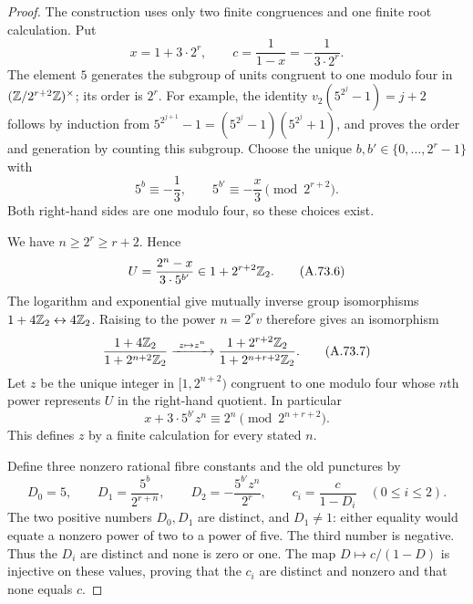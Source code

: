 \begin{proof}
The construction uses only two finite congruences and one finite
root calculation.  Put
\[
             x=1+3\cdot2^r,\qquad c=\frac1{1-x}=-\frac1{3\cdot2^r}.
       \tag{A.73.4}
\]
The element $5$ generates the subgroup of units congruent to one
modulo four in $(\mathbb Z/2^{r+2}\mathbb Z)^\times$; its order is $2^r$.
For example, the identity
$v_2(5^{2^j}-1)=j+2$ follows by induction from
$5^{2^{j+1}}-1=(5^{2^j}-1)(5^{2^j}+1)$, and proves the order
and generation by counting this subgroup.
Choose the unique $b,b'\in\{0,\ldots,2^r-1\}$ with
\[
           5^b\equiv-\frac13,
       \qquad 5^{b'}\equiv-\frac{x}{3}\pmod{2^{r+2}}.
       \tag{A.73.5}
\]
Both right-hand sides are one modulo four, so these choices exist.

We have $n\ge2^r\ge r+2$.  Hence
\[
             U=\frac{2^n-x}{3\cdot5^{b'}}
                           \in1+2^{r+2}\mathbb Z_2.
       \tag{A.73.6}
\]
The logarithm and exponential give mutually inverse group
isomorphisms $1+4\mathbb Z_2\leftrightarrow4\mathbb Z_2$.
Raising to the power $n=2^rv$ therefore gives an isomorphism
\[
 \frac{1+4\mathbb Z_2}{1+2^{n+2}\mathbb Z_2}
       \xrightarrow{\ z\mapsto z^n\ }
 \frac{1+2^{r+2}\mathbb Z_2}{1+2^{n+r+2}\mathbb Z_2}.
       \tag{A.73.7}
\]
Let $z$ be the unique integer in $[1,2^{n+2})$ congruent to one
modulo four whose $n$th power represents $U$ in the right-hand
quotient.  In particular
\[
                    x+3\cdot5^{b'}z^n
                         \equiv2^n\pmod{2^{n+r+2}}.
       \tag{A.73.8}
\]
This defines $z$ by a finite calculation for every stated $n$.

Define three nonzero rational fibre constants and the old
punctures by
\[
 D_0=5,\qquad D_1=\frac{5^b}{2^{r+n}},\qquad
 D_2=-\frac{5^{b'}z^n}{2^r},\qquad
 c_i=\frac{c}{1-D_i}\quad(0\le i\le2).
       \tag{A.73.9}
\]
The two positive numbers $D_0,D_1$ are distinct, and $D_1\ne1$:
either equality would equate a nonzero power of two to a power
of five.  The third number is negative.  Thus the $D_i$ are
distinct and none is zero or one.  The map $D\mapsto c/(1-D)$
is injective on these values, proving that the $c_i$ are distinct
and nonzero and that none equals $c$.


\end{proof}
